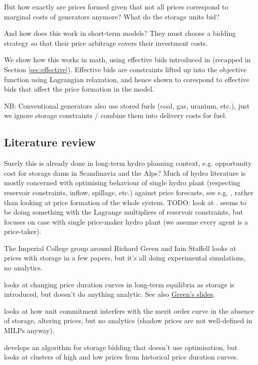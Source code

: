 \documentclass[final,3p,times]{elsarticle}
\begin{document}
But how exactly are prices formed given that not all prices correspond to
marginal costs of generators anymore? What do the storage units bid?

And how does this work in short-term models? They must choose a bidding strategy
so that their price arbitrage covers their investment costs.

We show how this works in math, using effective bids introduced in
\cite{Brown2020} (recapped in Section \ref{sec:effective}). Effective bids are
constraints lifted up into the objective function using Lagrangian relaxation,
and hence shown to corespond to effective bids that affect the price formation
in the model.


NB: Conventional generators also use stored fuels (coal, gas, uranium, etc.),
just we ignore storage constraints / combine them into delivery costs for fuel.

\subsection{Literature review}

Surely this is already done in long-term hydro planning context, e.g.
opportunity cost for storage dams in Scandinavia and the Alps? Much of hydro
literature is mostly concerned with optimising behaviour of single hydro plant
(respecting reservoir constraints, inflow, spillage, etc.) against price
forecasts, see e.g. \cite{Pereira1989,Rotting1992,Fosso1999}, rather than
looking at price formation of the whole system. TODO: look at
\cite{horsley2016}. \cite{Steeger2017} seems to be doing something with the
Lagrange multipliers of reservoir constraints, but focuses on case with single
price-maker hydro plant (we assume every agent is a price-taker).

The Imperial College group around Richard Green and Iain Staffell looks at
prices with storage in a few papers, but it's all doing experimental
simulations, no analytics.

\cite{Green2015} looks at changing price duration curves in long-term equilibria
as storage is introduced, but doesn't do anything analytic. See also
\href{https://spiral.imperial.ac.uk/handle/10044/1/51138}{Green's slides}.


\cite{Staffell2016} looks at how unit commitment interfers with the merit order
curve in the absence of storage, altering prices, but no analytics (shadow
prices are not well-defined in MILPs anyway).

\cite{Ward2018} develops an algorithm for storage bidding that doesn't use
optimisation, but looks at clusters of high and low prices from historical price
duration curves.
\end{document}
